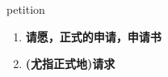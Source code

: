 
\begin{frame}
{\huge petition}
\begin{center}
\begin{enumerate}\Large
  \item \textbf{请愿，正式的申请，申请书}
  \item \textbf{(尤指正式地)请求}
\end{enumerate}
\end{center}
\end{frame}
